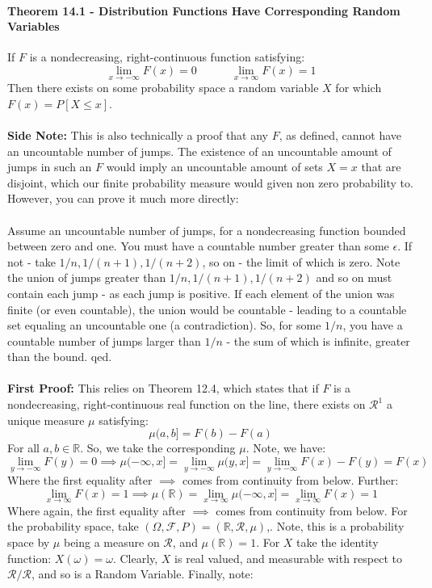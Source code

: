 \documentclass[12pt,a4paper]{article}
\newcommand{\1}[1]{\mathbbm{1}\left\{ #1 \right\}}
\newcommand{\R}{\mathbb{R}}
\newcommand{\fcal}{\mathcal{F}}
\newcommand{\rcal}{\mathcal{R}}
\begin{document}
\paragraph{Theorem 14.1 - Distribution Functions Have Corresponding Random Variables} If $F$ is a nondecreasing, right-continuous function satisfying:
$$
	\lim_{x \to -\infty} F(x) = 0 \quad\quad\quad
	\lim_{x \to \infty} F(x) = 1
$$
Then there exists on some probability space a random variable $X$ for which $F(x) = P\left[X \leq x\right]$.
\\\\
\textbf{Side Note:} This is also technically a proof that any $F$, as defined, cannot have an uncountable number of jumps. The existence of an uncountable amount of jumps in such an $F$ would imply an uncountable amount of sets $X = x$ that are disjoint, which our finite probability measure would given non zero probability to. However, you can prove it much more directly:
\\\\
Assume an uncountable number of jumps, for a nondecreasing function bounded between zero and one. You must have a countable number greater than some $\epsilon$. If not - take $1/n, 1/(n+1), 1/(n+2)$, so on - the limit of which is zero. Note the union of jumps greater than $1/n, 1/(n+1), 1/(n+2)$ and so on must contain each jump - as each jump is positive. If each element of the union was finite (or even countable), the union would be countable - leading to a countable set equaling an uncountable one (a contradiction). So, for some $1/n$, you have a countable number of jumps larger than $1/n$ - the sum of which is infinite, greater than the bound. qed. 
\\\\
\textbf{First Proof:} This relies on Theorem 12.4, which states that if $F$ is a nondecreasing, right-continuous real function on the line, there exists on $\rcal^1$ a unique measure $\mu$ satisfying:
$$
	\mu(a,b] = F(b) - F(a)
$$
For all $a,b \in \R$. So, we take the corresponding $\mu$. Note, we have:
$$
	\lim_{y \to -\infty} F(y) = 0 \implies
	\mu(-\infty,x] = \lim_{y \to -\infty} \mu(y,x] = \lim_{y \to -\infty} F(x) - F(y) = F(x)
$$
Where the first equality after $\implies$ comes from continuity from below. Further:
$$
	\lim_{x \to \infty} F(x) = 1 \implies \mu(\R) = \lim_{x \to \infty} \mu(-\infty,x] = \lim_{x \to \infty} F(x) = 1
$$
Where again, the first equality after $\implies$ comes from continuity from below. For the probability space, take $(\Omega,\fcal,P) = (\R,\rcal,\mu)$,. Note, this is a probability space by $\mu$ being a measure on $\rcal$, and $\mu(\R) = 1$. For $X$ take the identity function: $X(\omega) = \omega$. Clearly, $X$ is real valued, and measurable with respect to $\rcal/\rcal$, and so is a Random Variable. Finally, note:
\end{document}
